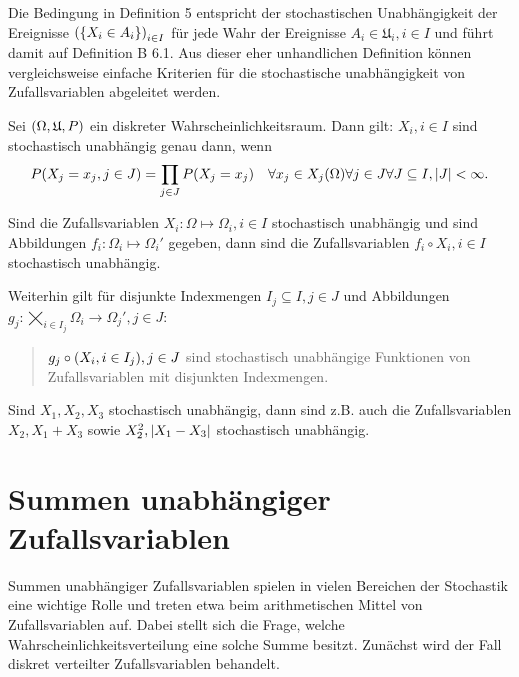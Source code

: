 \documentclass{lecture}
\begin{document}
    Die Bedingung in Definition 5 entspricht der stochastischen Unabhängigkeit der Ereignisse \(\parentheses*{\braces*{X_i \in A_i}}_{i \in I}\) für jede Wahr der Ereignisse \(A_i \in \mathfrak{U}_i, i \in I\) und führt damit auf Definition B 6.1.
    Aus dieser eher unhandlichen Definition können vergleichsweise einfache Kriterien für die stochastische unabhängigkeit von Zufallsvariablen abgeleitet werden.

    \begin{lemma}
        Sei \(\parentheses*{\Omega, \mathfrak{U}, P}\) ein diskreter Wahrscheinlichkeitsraum.
        Dann gilt: \(X_i, i \in I\) sind stochastisch unabhängig genau dann, wenn
        \[
            P\parentheses*{X_j = x_j, j \in J} = \prod_{j \in J}P\parentheses*{X_j = x_j} \quad \forall x_j \in X_j\parentheses*{\Omega} \forall j \in J \forall J \subseteq I, \absolute*{J} < \infty.
        \]
    \end{lemma}

    \begin{theorem}
        Sind die Zufallsvariablen \(X_i: \Omega \mapsto \Omega_i, i \in I\) stochastisch unabhängig und sind Abbildungen \(f_i: \Omega_i \mapsto \Omega_i'\) gegeben, dann sind die Zufallsvariablen \(f_i \circ X_i, i \in I\) stochastisch unabhängig.

        Weiterhin gilt für disjunkte Indexmengen \(I_j \subseteq I, j \in J\) und Abbildungen \(g_j: \bigtimes_{i \in I_j}\Omega_i \to \Omega_j', j \in J\):
        \begin{quote}
            \(g_j \circ \parentheses*{X_i, i \in I_j}, j \in J\) sind stochastisch unabhängige Funktionen von Zufallsvariablen mit disjunkten Indexmengen.
        \end{quote}
    \end{theorem}

    \begin{example}
        Sind \(X_1, X_2, X_3\) stochastisch unabhängig, dann sind z.B. auch die Zufallsvariablen \(X_2, X_1 + X_3\) sowie \(X_2^2, \absolute*{X_1 - X_3}\) stochastisch unabhängig.
    \end{example}


    \section*{Summen unabhängiger Zufallsvariablen}

    Summen unabhängiger Zufallsvariablen spielen in vielen Bereichen der Stochastik eine wichtige Rolle und treten etwa beim arithmetischen Mittel von Zufallsvariablen auf.
    Dabei stellt sich die Frage, welche Wahrscheinlichkeitsverteilung eine solche Summe besitzt.
    Zunächst wird der Fall diskret verteilter Zufallsvariablen behandelt.
\end{document}

